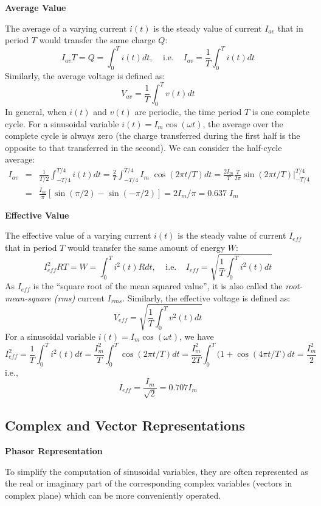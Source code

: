 {\bf Average Value} 

The average of a varying current $i(t)$ is the steady value of current 
$I_{av}$ that in period $T$ would transfer the same charge $Q$:
\[	I_{av}T=Q=\int_0^T i(t) dt,\;\;\;\;\mbox{i.e.}\;\;\;\;
	I_{av}=\frac{1}{T}\int_0^T i(t) dt	\]
Similarly, the average voltage is defined as:
\[	V_{av}=\frac{1}{T}\int_0^T v(t) dt	\]
In general, when $i(t)$ and $v(t)$ are periodic, the time period $T$ is
one complete cycle. For a sinusoidal variable $i(t)=I_m \cos(\omega t)$, 
the average over the complete cycle is always zero (the charge transferred 
during the first half is the opposite to that transferred in the second).
We can consider the half-cycle average:
\begin{eqnarray} 
I_{av}&=&\frac{1}{T/2}\int_{-T/4}^{T/4} i(t) dt
	=\frac{2}{T}\int_{-T/4}^{T/4} I_m\;\cos(2\pi t/T)dt	
	=\frac{2I_m}{T}\frac{T}{2\pi} \sin(2\pi t/T)|_{-T/4}^{T/4}
	\nonumber \\
	&=& \frac{I_m}{\pi}[\sin(\pi/2)-\sin(-\pi/2)]
	=2I_m/\pi=0.637\;I_m
	\nonumber
\end{eqnarray}

{\bf Effective Value}

The effective value of a varying current $i(t)$ is the steady value of 
current $I_{eff}$ that in period $T$ would transfer the same amount of 
energy $W$:
\[	I^2_{eff}RT=W=\int_0^T i^2(t)R dt,\;\;\;\;\mbox{i.e.}\;\;\;\;
	I_{eff}=\sqrt{\frac{1}{T}\int_0^T i^2(t) dt}	\]
As $I_{eff}$ is the ``square root of the mean squared value'', it is
also called the {\em root-mean-square (rms)} current $I_{rms}$.
Similarly, the effective voltage is defined as:
\[	V_{eff}=\sqrt{\frac{1}{T}\int_0^T v^2(t) dt}	\]
For a sinusoidal variable $i(t)=I_m \cos(\omega t)$, we have
\[
I^2_{eff} = \frac{1}{T}\int_0^T i^2(t) dt
	= \frac{I^2_m}{T}\int_0^T \cos(2\pi t/T) dt
	= \frac{I^2_m}{2T}\int_0^T (1+\cos(4\pi t/T) dt
	=\frac{I^2_m}{2}
\]
i.e.,
\[	I_{eff}=\frac{I_m}{\sqrt{2}}=0.707 I_m	\]

\subsection*{Complex and Vector Representations}

{\bf Phasor Representation}

To simplify the computation of sinusoidal variables, they are often
represented as the real or imaginary part of the corresponding complex 
variables (vectors in complex plane) which can be more conveniently 
operated.

